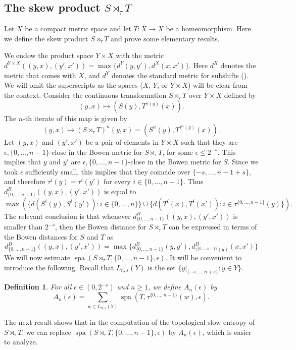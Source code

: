 \documentclass[a4paper,oneside]{amsart}
\renewcommand{\(}{\begin{dmath*}}
\renewcommand{\)}{\end{dmath*}}
\newtheorem{definition}[theorem]{Definition}
\theoremstyle{definition}
\newcommand{\spa}{\operatorname{spa}}
\begin{document}
\subsection{The skew product $S\rtimes_\tau T$}
Let $X$ be a compact metric space and let $T\colon X\to X$ be a homeomorphism. Here we define the skew product $S\rtimes_\tau T$ and prove some elementary results. 

We endow the product space $Y\times X$ with the metric $d^{Y\times X}((y,x), (y',x'))=\max\{d^Y(y,y'),d^X(x,x')\}$. Here $d^X$ denotes the metric that comes with $X$, and $d^Y$ denotes the standard metric for subshifts (). We will omit the superscripts as the spaces ($X$, $Y$, or $Y\times X$) will be clear from the context. Consider the continuous transformation $S\rtimes_\tau T$ over $Y\times X$ defined by 
\[(y,x)\mapsto (S(y),T^{\tau(y)}(x)).\]
The $n$-th iterate of this map is given by 
\[(y,x)\mapsto(S\rtimes_\tau T)^n(y,x)=(S^n(y),T^{\tau^n(y)}(x)).\]
Let $(y,x)$ and $(y',x')$ be a pair of elements in $Y\times X$ such that they are $\epsilon,\{0,\dots,n-1\}$-close in the Bowen metric for $S\rtimes_\tau T$, for some $\epsilon\leq 2^{-s}$. This implies that $y$ and $y'$ are $\epsilon,\{0,\dots,n-1\}$-close in the Bowen metric for $S$. Since we took $\epsilon$ sufficiently small, this implies that they coincide over $\{-s,\dots,n-1+s\}$, and therefore $\tau^i(y)=\tau^i(y')$ for every $i\in\{0,\dots,n-1\}$. Thus $d^B_{\{0,\dots,n-1\}}((y,x),(y',x'))$ is equal to
\[\max(\{d(S^i(y),S^i(y')) : i\in \{0,\dots,n\}\}\cup \{d(T^i(x),T^i(x')) : i \in \tau^{\{0,\dots,n-1\}}(y)\}).\]
The relevant conclusion is that whenever $d^B_{\{0,\dots,n-1\}}((y,x),(y',x'))$ is smaller than $2^{-s}$, then the Bowen distance for $S\rtimes_\tau T$ can be expressed in terms of the Bowen distances for $S$ and $T$ as
\begin{equation}\label{lemma-bowen-metrics} d^B_{\{0,\dots,n-1\}}((y,x),(y',x'))=\max\{d^B_{\{0,\dots,n-1\}}(y,y'),d^B_{\tau^{\{0,\dots,n-1\}}(y)}(x,x')\}\end{equation}
We will now estimate  $\spa(S\rtimes_\tau T,\{0,\dots,n-1\},\epsilon)$. It will be convenient to introduce the following. Recall that $L_{n,s}(Y)$ is the set $\{y|_{\{-s,\dots,n+s\}}:y\in Y\}$.
\begin{definition}
    For all $\epsilon\in (0,2^{-s})$ and $n\geq 1$,  we define $A_n(\epsilon)$  by
    \[A_n(\epsilon)=\sum_{w\in L_{n,s}(Y)}\spa(T,\tau^{\{0,\dots,n-1\}}(w),\epsilon).\]
\end{definition}
The next result shows that in the computation of the topological slow entropy of $S\rtimes_\tau T$, we can replace $\spa(S\rtimes_\tau T,\{0,\dots,n-1\},\epsilon)$ by $A_n(\epsilon)$, which is easier to analyze. 
\end{document}
